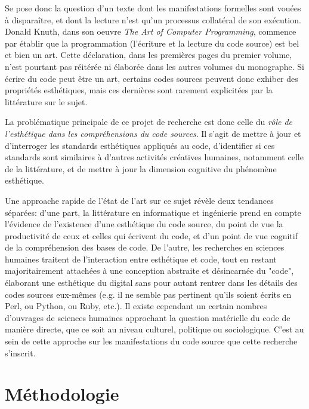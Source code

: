 \documentclass{article}
\begin{document}
Se pose donc la question d'un texte dont les manifestations formelles sont vouées à disparaître, et dont la lecture n'est qu'un processus collatéral de son exécution. Donald Knuth, dans son oeuvre \emph{The Art of Computer Programming}\cite{knuth_art_1997}, commence par établir que la programmation (l'écriture et la lecture du code source) est bel et bien un art. Cette déclaration, dans les premières pages du premier volume, n'est pourtant pas réitérée ni élaborée dans les autres volumes du monographe. Si écrire du code peut être un art, certains codes sources peuvent donc exhiber des propriétés esthétiques, mais ces dernières sont rarement explicitées par la littérature sur le sujet.

La problématique principale de ce projet de recherche est donc celle du \emph{rôle de l'esthétique dans les compréhensions du code sources}. Il s'agit de mettre à jour et d'interroger les standards esthétiques appliqués au code, d'identifier si ces standards sont similaires à d'autres activités créatives humaines, notamment celle de la littérature, et de mettre à jour la dimension cognitive du phénomène esthétique.

Une approache rapide de l'état de l'art sur ce sujet révèle deux tendances séparées: d'une part, la littérature en informatique et ingénierie prend en compte l'évidence de l'existence d'une esthétique du code source, du point de vue la productivité de ceux et celles qui écrivent du code, et d'un point de vue cognitif de la compréhension des bases de code\cite{oram_beautiful_2007,cox_programming_2009,gabriel_mob_2001,martin_clean_2008,detienne_software_2012,weinberg_psychology_1998}. De l'autre, les recherches en sciences humaines traitent de l'interaction entre esthétique et code, tout en restant majoritairement attachées à une conception abstraite et désincarnée du "code", élaborant une esthétique du digital sans pour autant rentrer dans les détails des codes sources eux-mêmes (e.g. il ne semble pas pertinent qu'ils soient écrits en Perl, ou Python, ou Ruby, etc.)\cite{cramer_executupable_2019,hayles_my_2010,mackenzie_cutting_2006,levy_programmation_1992}. Il existe cependant un certain nombres d'ouvrages de sciences humaines approchant la question matérielle du code de manière directe, que ce soit au niveau culturel\cite{montfort_10_2014}, politique\cite{cox_speaking_2013} ou sociologique\cite{paloque-berges_poetique_2009}. C'est au sein de cette approche sur les manifestations du code source que cette recherche s'inscrit.

\section{Méthodologie}
\end{document}
